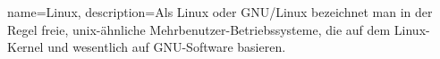 {
  name={Linux},
  description={Als Linux oder GNU/Linux bezeichnet man in der Regel freie, unix-ähnliche Mehrbenutzer-Betriebssysteme, die auf dem Linux-Kernel und wesentlich auf GNU-Software basieren.}
}

